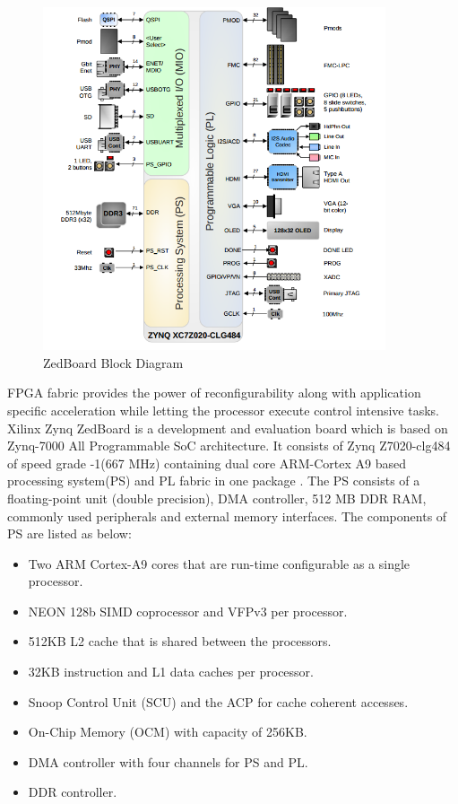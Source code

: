 \begin{figure}
	\centering
	\includegraphics[width=0.9\textwidth]{images/zedboard_block.png}
	\caption{ZedBoard Block Diagram\cite{12}}
	\label{zed:blk}
\end{figure}

FPGA fabric provides the power of reconfigurability along with application specific acceleration while letting the processor execute control intensive tasks. Xilinx Zynq ZedBoard is a development and evaluation board which is based on Zynq-7000 All Programmable SoC architecture. It consists of Zynq Z7020-clg484 of speed grade -1(667 MHz) containing dual core ARM-Cortex A9 based processing system(PS) and PL fabric in one package \cite{13}. The PS consists of a floating-point unit (double precision), DMA controller, 512 MB DDR RAM, commonly used peripherals and external memory interfaces. The components of PS are listed as below:


\begin{itemize}
	\item Two ARM Cortex-A9 cores that are run-time configurable as a single processor.
	\item NEON 128b SIMD coprocessor and VFPv3 per processor.
	\item 512KB L2 cache that is shared between the processors.
	\item 32KB instruction and L1 data caches per processor.
	\item Snoop Control Unit (SCU) and the ACP for cache coherent accesses.
	\item On-Chip Memory (OCM) with capacity of 256KB.
	\item DMA controller with four channels for PS and PL.
	\item DDR controller.
	\end{itemize}

